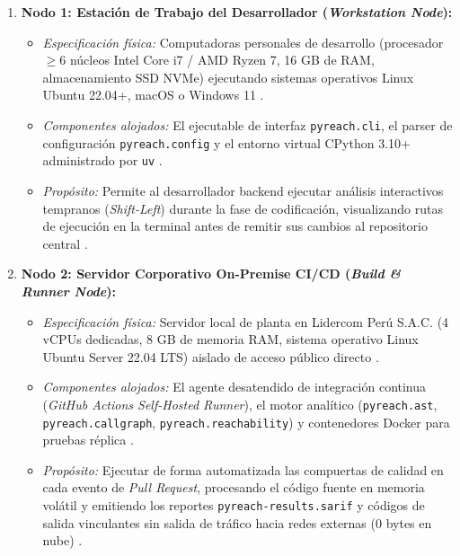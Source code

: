 \begin{enumerate}
    \item \textbf{Nodo 1: Estación de Trabajo del Desarrollador (\textit{Workstation Node}):}
    \begin{itemize}
        \item \textit{Especificación física:} Computadoras personales de desarrollo (procesador $\ge 6$ núcleos Intel Core i7 / AMD Ryzen 7, 16 GB de RAM, almacenamiento SSD NVMe) ejecutando sistemas operativos Linux Ubuntu 22.04+, macOS o Windows 11 \cite{torres2026proyecto}.
        \item \textit{Componentes alojados:} El ejecutable de interfaz \texttt{pyreach.\allowbreak cli}, el parser de configuración \texttt{pyreach.\allowbreak config} y el entorno virtual CPython 3.10+ administrado por \texttt{uv} \cite{salis2021pycg}.
        \item \textit{Propósito:} Permite al desarrollador backend ejecutar análisis interactivos tempranos (\textit{Shift-Left}) durante la fase de codificación, visualizando rutas de ejecución en la terminal antes de remitir sus cambios al repositorio central \cite{humble2010continuous}.
    \end{itemize}

    \item \textbf{Nodo 2: Servidor Corporativo On-Premise CI/CD (\textit{Build \& Runner Node}):}
    \begin{itemize}
        \item \textit{Especificación física:} Servidor local de planta en Lidercom Perú S.A.C. (4 vCPUs dedicadas, 8 GB de memoria RAM, sistema operativo Linux Ubuntu Server 22.04 LTS) aislado de acceso público directo \cite{torres2026proyecto}.
        \item \textit{Componentes alojados:} El agente desatendido de integración continua (\textit{GitHub Actions Self-Hosted Runner}), el motor analítico (\texttt{pyreach.\allowbreak ast}, \texttt{pyreach.\allowbreak callgraph}, \texttt{pyreach.\allowbreak reachability}) y contenedores Docker para pruebas réplica \cite{humble2010continuous}.
        \item \textit{Propósito:} Ejecutar de forma automatizada las compuertas de calidad en cada evento de \textit{Pull Request}, procesando el código fuente en memoria volátil y emitiendo los reportes \texttt{pyreach-\allowbreak results.\allowbreak sarif} y códigos de salida vinculantes sin salida de tráfico hacia redes externas (0 bytes en nube) \cite{ladisa2023sok}.
    \end{itemize}


\end{enumerate}
